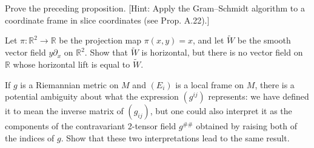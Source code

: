 \begin{exercise}
\label{exer:gram-schmidt-adapted-frame}
Prove the preceding proposition. [Hint: Apply the Gram--Schmidt algorithm to a coordinate frame in slice coordinates (see Prop. A.22).]
\end{exercise}

\begin{exercise}
\label{exer:horizontal-vector-field-not-lift}


Let $\pi: \mathbb{R}^2 \to \mathbb{R}$ be the projection map $\pi(x,y) = x$, and let $\tilde{W}$ be the smooth vector field $y\partial_x$ on $\mathbb{R}^2$. Show that $\tilde{W}$ is horizontal, but there is no vector field on $\mathbb{R}$ whose horizontal lift is equal to $\tilde{W}$.
\end{exercise}

\begin{exercise}
\label{exer:inverse-metric-ambiguity}


If $g$ is a Riemannian metric on $M$ and $(E_i)$ is a local frame on $M$, there is a potential ambiguity about what the expression $(g^{ij})$ represents: we have defined it to mean the inverse matrix of $(g_{ij})$, but one could also interpret it as the components of the contravariant 2-tensor field $g^{\#\#}$ obtained by raising both of the indices of $g$. Show that these two interpretations lead to the same result.
\end{exercise}

